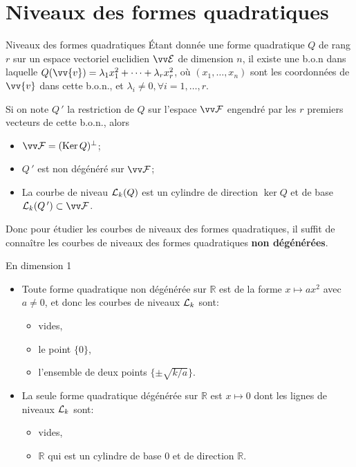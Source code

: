 \documentclass[11pt]{m53beamer}
\begin{document}
\section{Niveaux des formes quadratiques}

\begin{frame}{Niveaux des formes quadratiques}
  Étant donnée une forme quadratique $Q$ de rang $r$ sur un espace vectoriel euclidien $\ev{E}$ de dimension $n$\pause, il existe une b.o.n dans laquelle $Q(\vv{v})=\lambda_{1}x_{1}^{2}+\cdots+\lambda_{r}x_{r}^{2}$\pause, où $(x_{1},\ldots,x_{n})$ sont les coordonnées de $\vv{v}$ dans cette b.o.n.\pause, et $\lambda_{i} \neq 0, \forall i=1,\ldots,r$.\pause

  Si on note $Q\,'$ la restriction de $Q$ sur l'espace $\ev{F}$ engendré par les $r$ premiers vecteurs de cette b.o.n., alors
  \begin{itemize}[<+(1)->]
    \item $\ev{F} = (\ker Q)^{\perp}$;
    \item $Q\,'$ est non dégénéré sur $\ev{F}$;
    \item La courbe de niveau $\mathcal{L}_{k}(Q)$ est un cylindre de direction $\ker Q$ et de base $\ens{L}_{k}(Q\,') \subset \ev{F}$.
  \end{itemize}\pause

  Donc pour étudier les courbes de niveaux des formes quadratiques, il suffit de connaître les courbes de niveaux des formes quadratiques \textbf{non dégénérées}.

\end{frame}

\begin{frame}{En dimension 1}
  \begin{itemize}[<+(1)->]
    \item Toute forme quadratique non dégénérée sur $\mathbb{R}$ est de la forme $x\mapsto a x^{2}$ avec $a \neq 0$, et donc les courbes de niveaux $\mathcal{L}_{k}$ sont:
    \begin{itemize}[<+(1)->]
      \item {} vides,
      \item {} le point $\{0\}$,
      \item {} l'ensemble de deux points $\{\pm\sqrt{k/a}\}$.
    \end{itemize}
    \item La seule forme quadratique dégénérée sur $\mathbb{R}$ est $x\mapsto 0$ dont les lignes de niveaux $\mathcal{L}_{k}$ sont:
    \begin{itemize}[<+(1)->]
      \item {} vides,
      \item {} $\mathbb{R}$  qui est un cylindre de base $0$ et de direction $\mathbb{R}$.
    \end{itemize}
  \end{itemize}
\end{frame}
\end{document}
